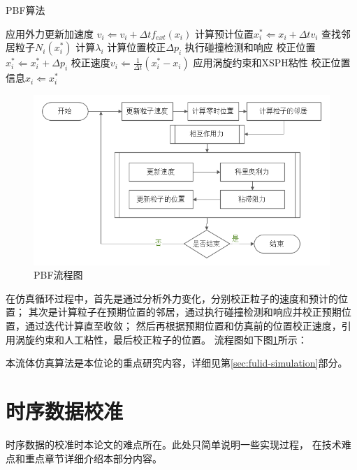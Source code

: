 \begin{algorithm}
  \caption{PBF算法}
  \label{alg:pbf-algorithm}
\begin{algorithmic}
\STATE 应用外力更新加速度 $v_i \Leftarrow v_i + \Delta{}tf_{ext}(x_i) $
\STATE 计算预计位置$x_i^{*} \Leftarrow x_i + \Delta{} tv_i$
\ENDFOR
{}
\STATE 查找邻居粒子$N_i(x_i^*)$
\ENDFOR
{}
\STATE 计算$\lambda_i$
\ENDFOR
{}
\STATE 计算位置校正$\Delta{}p_i$
\STATE 执行碰撞检测和响应
\ENDFOR
{}
\STATE 校正位置$x_i^* \Leftarrow x_i^* + \Delta{}p_i$
\ENDFOR
\ENDWHILE
{}
\STATE 校正速度$v_i \Leftarrow \frac{1}{\Delta{}t}(x_i^*-x_i)$
\STATE 应用涡旋约束和XSPH粘性
\STATE 校正位置信息$x_i \Leftarrow x_i^*$
\ENDFOR
\end{algorithmic}
\end{algorithm}
\begin{figure}
	\centering
	\includegraphics[width = 350bp]{figure/PBF-flow-chart.png}
	\caption{PBF流程图}
	\label{fig:pbf-flow-chart}
\end{figure}
在仿真循环过程中，首先是通过分析外力变化，分别校正粒子的速度和预计的位置；
其次是计算粒子在预期位置的邻居，通过执行碰撞检测和响应并校正预期位置，通过迭代计算直至收敛；
然后再根据预期位置和仿真前的位置校正速度，引用涡旋约束和人工粘性，最后校正粒子的位置。
流程图如下图\ref{fig:pbf-flow-chart}所示：


本流体仿真算法是本位论的重点研究内容，详细见第\ref{sec:fulid-simulation}部分。

\section{时序数据校准}

时序数据的校准时本论文的难点所在。此处只简单说明一些实现过程，
在技术难点和重点章节详细介绍本部分内容。

